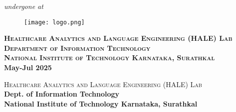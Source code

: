 \documentclass[a4paper, 10 pt, conference]{ieeeconf}
\begin{document}
\begin{center}
		\large {\textit{undergone at}}\\
		
    \vspace{2em}
    \begin{figure}[!ht]
        \centering
        \texttt{[image: logo.png]}
    \end{figure}
    \vspace{1.5em}
    {\Large \bfseries \textsc{Healthcare Analytics and Language Engineering (HALE) Lab}}\\
    \vspace{1em}
      {\Large \bfseries \textsc{Department of Information Technology}}\\
    \vspace{1em}
    {\Large \bfseries \textsc{National Institute of Technology Karnataka, Surathkal}}\\
    
    \vspace{1em}
    {\Large \bfseries May-Jul 2025}
\end{center}


\newpage
\vspace{40mm}
\begin{center}
\LARGE{\textsc{Healthcare Analytics and Language Engineering (HALE) Lab}}\\
\Large{\textbf{Dept. of Information Technology}}\\
\Large{\textbf{National Institute of Technology Karnataka, Surathkal}}\\
\end{center}
\end{document}
